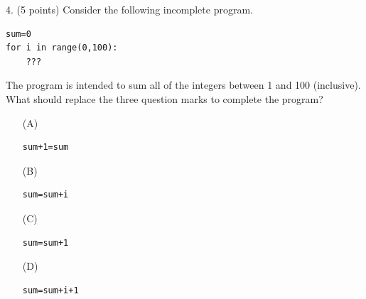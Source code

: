 \documentclass{article}
\newcounter{question}
\begin{document}
\noindent
\begin{minipage}{\textwidth}
4. (5 points)
Consider the following incomplete program.
\begin{verbatim}
sum=0
for i in range(0,100):
    ???

\end{verbatim}
The program is intended to sum all of the integers between 1 and 100 (inclusive). What should replace the three question marks to complete the program?

\begin{enumerate}
\item[(A)]
\begin{verbatim}sum+1=sum \end{verbatim}

\item[(B)]
\begin{verbatim}sum=sum+i \end{verbatim}

\item[(C)]
\begin{verbatim}sum=sum+1\end{verbatim}

\item[(D)]
\begin{verbatim}sum=sum+i+1 \end{verbatim}

\end{enumerate}
\end{minipage}
\vspace{10em}
\filbreak\vfil{}\vfilneg
\end{document}

